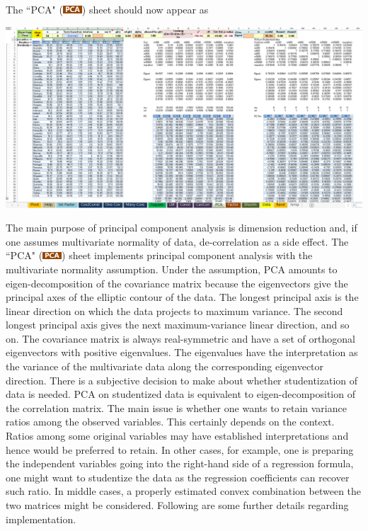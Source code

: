 \documentclass[article]{jss}
\newcommand{\shtPCA}{``PCA" (\includegraphics[height=8pt, keepaspectratio=true]{PcaSheetTab_png}) }
\begin{document}
        The \shtPCA sheet should now appear as
        \begin{center}
          \includegraphics[width=\linewidth,keepaspectratio=true]{PCASheetOutput_png}
        \end{center}
        The main purpose of principal component analysis is dimension reduction and, if one assumes multivariate normality of data, de-correlation as a side effect. The \shtPCA sheet implements principal component analysis with the multivariate normality assumption. Under the assumption, PCA amounts to eigen-decomposition of the covariance matrix because the eigenvectors give the principal axes of the elliptic contour of the data. The longest principal axis is the linear direction on which the data projects to maximum variance. The second longest principal axis gives the next maximum-variance linear direction, and so on.
        The covariance matrix is always real-symmetric and have a set of orthogonal eigenvectors with positive eigenvalues. The eigenvalues have the interpretation as the variance of the multivariate data along the corresponding eigenvector direction.
        There is a subjective decision to make about whether studentization of data is needed. PCA on studentized data is equivalent to eigen-decomposition of the correlation matrix. The main issue is whether one wants to retain variance ratios among the observed variables. This certainly depends on the context. Ratios among some original variables may have established interpretations and hence would be preferred to retain. In other cases, for example, one is preparing the independent variables going into the right-hand side of a regression formula, one might want to studentize the data as the regression coefficients can recover such ratio. In middle cases, a properly estimated convex combination between the two matrices might be considered.
        Following are some further details regarding implementation.
\end{document}
